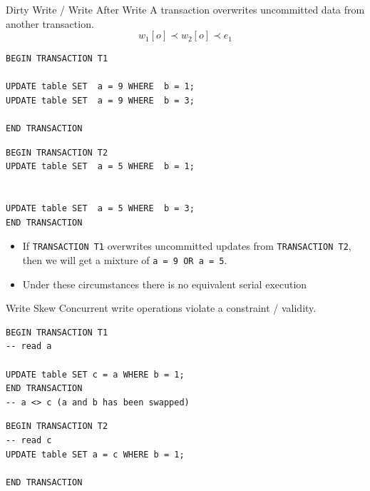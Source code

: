 \begin{definitionbox}{Dirty Write / Write After Write}
    A transaction overwrites uncommitted data from another transaction.
    \[w_1[o] \prec w_2[o] \prec e_1\]
    \tcblower
    \begin{minipage}[t]{.49\textwidth}
        \begin{verbatim}
BEGIN TRANSACTION T1

UPDATE table SET  a = 9 WHERE  b = 1;
UPDATE table SET  a = 9 WHERE  b = 3;

END TRANSACTION
       \end{verbatim}
   \end{minipage} \hfill \begin{minipage}[t]{.49\textwidth}
       \begin{verbatim}
BEGIN TRANSACTION T2
UPDATE table SET  a = 5 WHERE  b = 1;


UPDATE table SET  a = 5 WHERE  b = 3;
END TRANSACTION
       \end{verbatim}
   \end{minipage}
   \begin{itemize}
     \item If \texttt{TRANSACTION T1} overwrites uncommitted updates from \texttt{TRANSACTION T2}, then we will get a mixture of \texttt{a = 9 OR a = 5}.
     \item Under these circumstances there is no equivalent serial execution
   \end{itemize}
\end{definitionbox}

\begin{definitionbox}{Write Skew}
    Concurrent write operations violate a constraint / validity.
    \tcblower
    \begin{minipage}[t]{.49\textwidth}
        \begin{verbatim}
BEGIN TRANSACTION T1
-- read a

UPDATE table SET c = a WHERE b = 1;
END TRANSACTION
-- a <> c (a and b has been swapped)
       \end{verbatim}
   \end{minipage} \hfill \begin{minipage}[t]{.49\textwidth}
       \begin{verbatim}
BEGIN TRANSACTION T2
-- read c
UPDATE table SET a = c WHERE b = 1;

END TRANSACTION
       \end{verbatim}
   \end{minipage}
\end{definitionbox}

